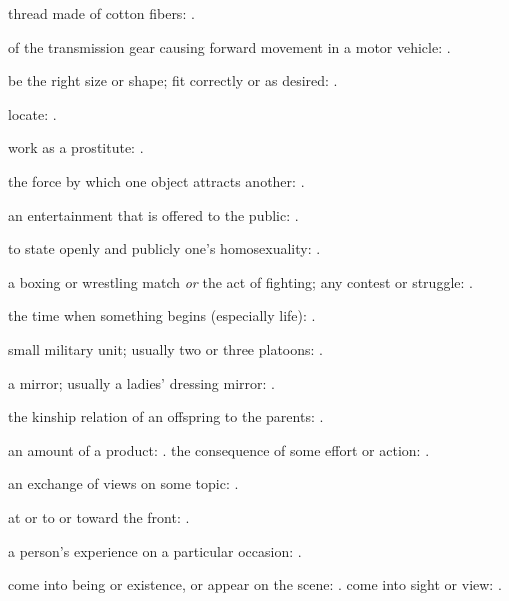   thread made of cotton fibers: .

  of the transmission gear causing forward movement in a motor vehicle: .

  be the right size or shape; fit correctly or as desired:   .

  locate:   .

  work as a prostitute: .

  the force by which one object attracts another:   .

  an entertainment that is offered to the public: .

  to state openly and publicly one's homosexuality:   .

  a boxing or wrestling match \textit{or} the act of fighting; any contest or struggle: .

  the time when something begins (especially life): .

  small military unit; usually two or three platoons: .

  a mirror; usually a ladies' dressing mirror:   .

  the kinship relation of an offspring to the parents:   .

  an amount of a product:   . the consequence of some effort or action: .

  an exchange of views on some topic:   .

  at or to or toward the front:   .

  a person's experience on a particular occasion: .

  come into being or existence, or appear on the scene:   . come into sight or view: .

